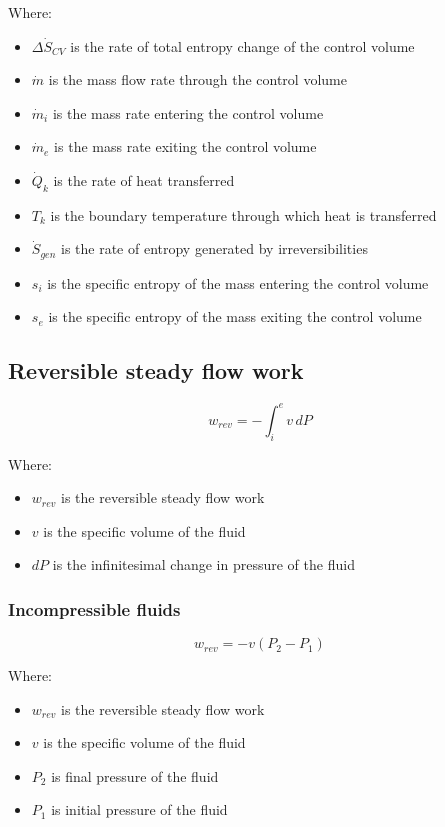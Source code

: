 \documentclass[11pt]{article}
\begin{document}
Where:
\begin{itemize}
\item \(\Delta \dot{S}_{CV}\) is the rate of total entropy change of the control volume
\item \(\dot{m}\) is the mass flow rate through the control volume
\item \(\dot{m}_i\) is the mass rate entering the control volume
\item \(\dot{m}_e\) is the mass rate exiting the control volume
\item \(\dot{Q}_k\) is the rate of heat transferred
\item \(T_k\) is the boundary temperature through which heat is transferred
\item \(\dot{S}_{gen}\) is the rate of entropy generated by irreversibilities
\item \(s_i\) is the specific entropy of the mass entering the control volume
\item \(s_e\) is the specific entropy of the mass exiting the control volume
\end{itemize}

\subsection{Reversible steady flow work}
\label{sec:org1085aa0}
\[w_{rev} = - \int_i^e v \, dP\]

Where:
\begin{itemize}
\item \(w_{rev}\) is the reversible steady flow work
\item \(v\) is the specific volume of the fluid
\item \(dP\) is the infinitesimal change in pressure of the fluid
\end{itemize}

\subsubsection{Incompressible fluids}
\label{sec:orgeb51124}
\[w_{rev} = -v (P_2 - P_1)\]

Where:
\begin{itemize}
\item \(w_{rev}\) is the reversible steady flow work
\item \(v\) is the specific volume of the fluid
\item \(P_2\) is final pressure of the fluid
\item \(P_1\) is initial pressure of the fluid
\end{itemize}
\end{document}
